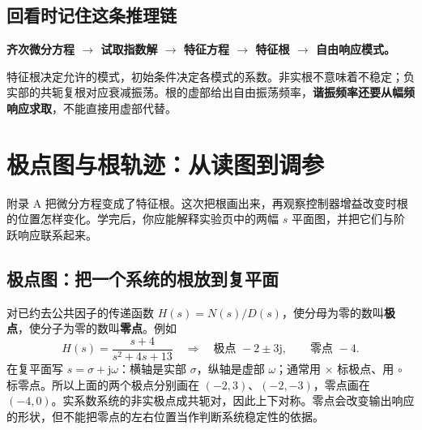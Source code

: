 \documentclass[UTF8,a4paper,11pt,fontset=windows]{ctexart}
\begin{document}
\subsection{回看时记住这条推理链}
\begin{keybox}
\textbf{齐次微分方程 $\to$ 试取指数解 $\to$ 特征方程 $\to$ 特征根 $\to$ 自由响应模式。}

特征根决定允许的模式，初始条件决定各模式的系数。非实根不意味着不稳定；负实部的共轭复根对应衰减振荡。根的虚部给出自由振荡频率，\textbf{谐振频率还要从幅频响应求取}，不能直接用虚部代替。
\end{keybox}

\newpage
\section{极点图与根轨迹：从读图到调参}\label{app:poles-locus}

附录 A 把微分方程变成了特征根。这次把根画出来，再观察控制器增益改变时根的位置怎样变化。学完后，你应能解释实验页中的两幅 $s$ 平面图，并把它们与阶跃响应联系起来。

\subsection{极点图：把一个系统的根放到复平面}
对已约去公共因子的传递函数 $H(s)=N(s)/D(s)$，使分母为零的数叫\textbf{极点}，使分子为零的数叫\textbf{零点}。例如
\[
  H(s)=\frac{s+4}{s^2+4s+13}
  \quad\Rightarrow\quad
  \text{极点 }-2\pm3\mathrm{j},\qquad \text{零点 }-4.
\]
在复平面写 $s=\sigma+\mathrm{j}\omega$：横轴是实部 $\sigma$，纵轴是虚部 $\omega$；通常用 $\times$ 标极点、用 $\circ$ 标零点。所以上面的两个极点分别画在 $(-2,3)$、$(-2,-3)$，零点画在 $(-4,0)$。实系数系统的非实极点成共轭对，因此上下对称。零点会改变输出响应的形状，但不能把零点的左右位置当作判断系统稳定性的依据。
\end{document}

